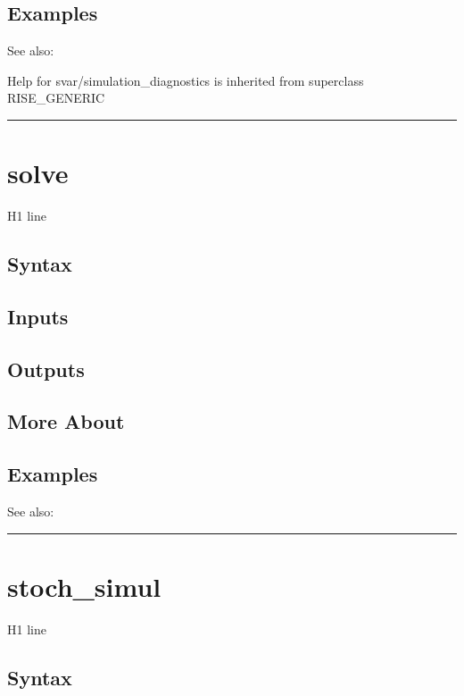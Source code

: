 \documentclass[letterpaper,10pt,english]{sphinxmanual}
\begin{document}
\subsection{Examples}
\label{classes/models/@svar/svar:id126}
See also:

Help for svar/simulation\_diagnostics is inherited from superclass RISE\_GENERIC


\bigskip\hrule{}\bigskip



\section{solve}
\label{classes/models/@svar/svar:id127}\label{classes/models/@svar/svar:solve}
H1 line


\subsection{Syntax}
\label{classes/models/@svar/svar:id128}

\subsection{Inputs}
\label{classes/models/@svar/svar:id129}

\subsection{Outputs}
\label{classes/models/@svar/svar:id130}

\subsection{More About}
\label{classes/models/@svar/svar:id131}

\subsection{Examples}
\label{classes/models/@svar/svar:id132}
See also:


\bigskip\hrule{}\bigskip



\section{stoch\_simul}
\label{classes/models/@svar/svar:id133}\label{classes/models/@svar/svar:stoch-simul}
H1 line


\subsection{Syntax}
\label{classes/models/@svar/svar:id134}
\end{document}
